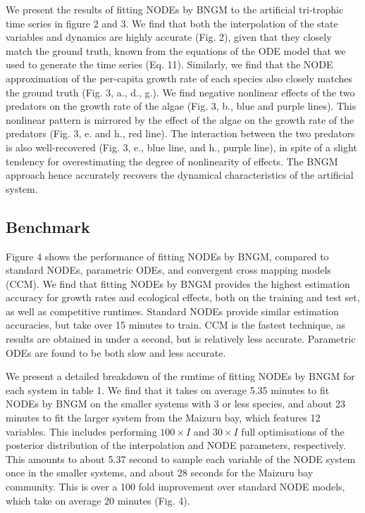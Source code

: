 \documentclass[11pt, oneside]{article}
\begin{document}
We present the results of fitting NODEs by BNGM to the artificial tri-trophic time series in figure 2 and 3.
We find that both the interpolation of the state variables and dynamics are highly accurate (Fig. 2), given that they closely match the ground truth, known from the equations of the ODE model that we used to generate the time series (Eq. 11).
Similarly, we find that the NODE approximation of the per-capita growth rate of each species also closely matches the ground truth (Fig. 3, a., d., g.). 
We find negative nonlinear effects of the two predators on the growth rate of the algae (Fig. 3, b., blue and purple lines).
This nonlinear pattern is mirrored by the effect of the algae on the growth rate of the predators (Fig. 3, e. and h., red line).
The interaction between the two predators is also well-recovered (Fig. 3, e., blue line, and h., purple line), in spite of a slight tendency for overestimating the degree of nonlinearity of effects.
The BNGM approach hence accurately recovers the dynamical characteristics of the artificial system.

\subsection{Benchmark}

Figure 4 shows the performance of fitting NODEs by BNGM, compared to standard NODEs, parametric ODEs, and convergent cross mapping models (CCM).
We find that fitting NODEs by BNGM provides the highest estimation accuracy for growth rates and ecological effects, both on the training and test set, as well as competitive runtimes. 
Standard NODEs provide similar estimation accuracies, but take over 15 minutes to train. 
CCM is the fastest technique, as results are obtained in under a second, but is relatively less accurate.
Parametric ODEs are found to be both slow and less accurate.

We present a detailed breakdown of the runtime of fitting NODEs by BNGM for each system in table 1.
We find that it takes on average 5.35 minutes to fit NODEs by BNGM on the smaller systems with 3 or less species, and about 23 minutes to fit the larger system from the Maizuru bay, which features 12 variables.
This includes performing $100 \times I$ and $30 \times I$ full optimisations of the posterior distribution of the interpolation and NODE parameters, respectively. 
This amounts to about 5.37 second to sample each variable of the NODE system once in the smaller systems, and about 28 seconds for the Maizuru bay community.
This is over a 100 fold improvement over standard NODE models, which take on average 20 minutes (Fig. 4).
\end{document}
